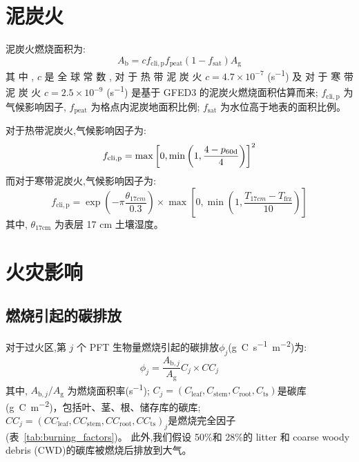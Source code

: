 \section{泥炭火}

泥炭火燃烧面积为:
\begin{equation}
  A_{\mathrm{b}}=c f_{\mathrm{c l i, p}} f_{\mathrm{peat}}\left(1-f_{\mathrm{sat}}\right) A_{\mathrm{g}}
\end{equation}
其 中 , $c$ 是 全 球 常 数 , 对 于 热 带 泥 炭 火 $c=4.7\times10^{-7}$ (\unit{s^{-1}}) 及 对 于 寒 带 泥 炭 火 $c=2.5\times10^{-9}$ (\unit{s^{-1}}) 是基于 GFED3 的泥炭火燃烧面积估算而来; $f_{\mathrm{cli,p}}$ 为气候影响因子, $f_{\mathrm{peat}}$ 为格点内泥炭地面积比例; $f_{\mathrm{sat}}$ 为水位高于地表的面积比例。

对于热带泥炭火,气候影响因子为:
\begin{equation}
  f_{\mathrm{c l i, p}}=\max \left[0, \min \left(1, \frac{4-p_{\rm 60d}}{4}\right)\right]^{2}
\end{equation}
而对于寒带泥炭火,气候影响因子为:
\begin{equation}
  f_{\mathrm{c l i, p}}=\exp \left(-\pi \frac{\theta_{17 c m}}{0.3}\right) \times \max \left[0, \min \left(1, \frac{T_{17 c m}-T_{\mathrm{frz}}}{10}\right)\right]
\end{equation}
其中, $\theta_{\text{17cm}}$ 为表层 17 cm 土壤湿度。

\section{火灾影响}
\subsection{燃烧引起的碳排放}

对于过火区,第 $j$ 个 PFT 生物量燃烧引起的碳排放${\phi}_{j} $(\unit{g.C.s^{-1}.m^{-2}})为:
%
\begin{equation}
  \phi_{j}=\frac{A_{\mathrm{b},j}}{A_{\mathrm{g}}} C_{j} \times C C_{j}
\end{equation}
%
其中, $A_{\mathrm{b},j}/A_{\mathrm {g}} $ 为燃烧面积率(\unit{s^{-1}}); $
C_{j}=\left(C_{\mathrm{leaf}}, C_{\mathrm{stem}}, C_{\mathrm{root}}, C_{\mathrm{t s}}\right)
$是碳库(\unit{g.C.m^{-2}})，包括叶、茎、根、储存库的碳库; $
C C_{j}=\left(C C_{\mathrm{leaf}}, C C_{\mathrm{stem}}, C C_{\mathrm{root}}, C C_{\mathrm{t s}}\right)_{j}
$是燃烧完全因子 (表~\ref{tab:burning_factors})。 此外,我们假设 50\%和 28\%的 litter 和 coarse woody debris (CWD)的碳库被燃烧后排放到大气。


